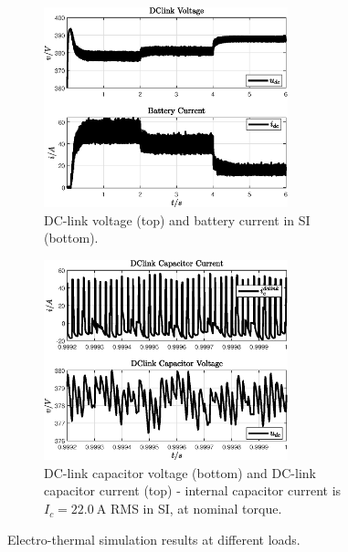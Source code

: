 \documentclass[11pt,a4paper,oneside]{book}
\numberwithin{equation}{section}
\theoremstyle{it}
\theoremstyle{definition}
\begin{document}
\begin{figure}[H]
	\centering
	\begin{subfigure}{0.5\textwidth}
		\centering
		\includegraphics[width = 200pt, angle = 0, 
		keepaspectratio]{figures/thermal_analysis/case_1/sim_results_fig_5.eps}
		\captionsetup{width=0.85\textwidth, font=footnotesize}	
		\caption{DC-link voltage (top) and battery current in SI (bottom).\vspace{5mm}}
		\label{}
	\end{subfigure}%
	\begin{subfigure}{.5\textwidth}
		\centering
		\includegraphics[width = 200pt, angle = 0, 
		keepaspectratio]{figures/thermal_analysis/case_1/sim_results_fig_6.eps}
		\captionsetup{width=0.85\textwidth, font=footnotesize}	
		\caption{DC-link capacitor voltage (bottom) and DC-link capacitor current (top) - internal capacitor current is $I_c=\SI{22.0}{\ampere}$ RMS in SI, at nominal torque.}
		\label{}
	\end{subfigure}
	\captionsetup{width=0.5\textwidth, font=small}	
	\caption{Electro-thermal simulation results at different loads.}
	\label{}
\end{figure}
\end{document}
